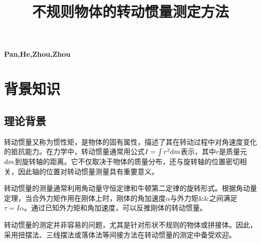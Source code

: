 \documentclass[12pt,hyperref,a4paper,UTF8]{ctexart}
\begin{document}
\cover

%
%

\thispagestyle{empty} %

\newpage
\begin{spacing}{2}
\tableofcontents
\end{spacing}
\thispagestyle{empty}
\paragraph{}
\newpage


\begin{center}
    \title{ \Huge \textbf{{不规则物体的转动惯量测定方法}}}
\end{center}
\par
\begin{center}
    \textbf{Pan,He,Zhou,Zhou}
\end{center}
\paragraph{}

\section{背景知识}
\subsection{理论背景}

转动惯量又称为惯性矩，是物体的固有属性，描述了其在转动过程中对角速度变化的抵抗能力。在力学中，转动惯量通常用公式$I=\int r^2\text dm$表示，其中$r$是质量元$\text dm$到旋转轴的距离。它不仅取决于物体的质量分布，还与旋转轴的位置密切相关，因此轴的位置对转动惯量测量具有重要意义。

转动惯量的测量通常利用角动量守恒定律和牛顿第二定律的旋转形式。根据角动量定理，当合外力矩作用在刚体上时，刚体的角加速度$\alpha$与外力矩&\tau&之间满足$\tau=I\alpha$。通过已知外力矩和角加速度，可以反推刚体的转动惯量。

转动惯量的测定并非容易的问题，尤其是针对形状不规则的物体或拼接体。因此，采用扭摆法、三线摆法或落体法等间接方法在转动惯量的测定中备受欢迎。
\end{document}
